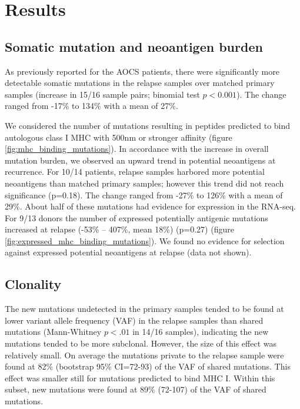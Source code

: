 \section*{Results}
\subsection*{Somatic mutation and neoantigen burden}

As previously reported for the AOCS patients, there were significantly more detectable somatic mutations in the relapse samples over matched primary samples (increase in 15/16 sample pairs; binomial test $p \lt 0.001$). The change ranged from -17\% to 134\% with a mean of 27\%.

We considered the number of mutations resulting in peptides predicted to bind autologous class I MHC with 500nm or stronger affinity (figure \ref{fig:mhc_binding_mutations}). In accordance with the increase in overall mutation burden, we observed an upward trend in potential neoantigens at recurrence. For 10/14 patients, relapse samples harbored more potential neoantigens than matched primary samples; however this trend did not reach significance (p=0.18). The change ranged from -27\% to 126\% with a mean of 29\%. About half of these mutations had evidence for expression in the RNA-seq. For 9/13 donors the number of expressed potentially antigenic mutations increased at relapse (-53\% -- 407\%, mean 18\%) (p=0.27) (figure \ref{fig:expressed_mhc_binding_mutations}). We found no evidence for selection against expressed potential neoantigens at relapse (data not shown).


\subsection*{Clonality}
The new mutations undetected in the primary samples tended to be found at lower variant allele frequency (VAF) in the relapse samples than shared mutations (Mann-Whitney $p \lt .01$ in 14/16 samples), indicating the new mutations tended to be more subclonal. However, the size of this effect was relatively small. On average the mutations private to the relapse sample were found at 82\% (bootstrap 95\% CI=72-93) of the VAF of shared mutations. This effect was smaller still for mutations predicted to bind MHC I. Within this subset, new mutations were found at 89\% (72-107) of the VAF of shared mutations.

